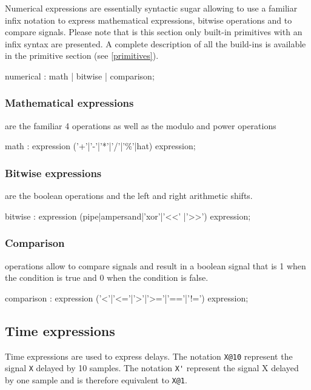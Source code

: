 \documentclass[a4paper,10pt]{book}
\begin{document}
Numerical expressions are essentially syntactic sugar allowing to use a familiar infix notation to express mathematical expressions, bitwise operations and to compare signals. Please note that is this section only built-in primitives with an infix syntax are presented. A complete description of all the build-ins is available in the primitive section (see \ref{primitives}). 

\begin{rail}
numerical : math | bitwise | comparison;
\end{rail}

\subsubsection{Mathematical expressions} are the familiar 4 operations as well as the modulo and power operations
\begin{rail}
math : expression ('+'|'-'|'*'|'/'|'\%'|hat) expression;
\end{rail}
 

\subsubsection{Bitwise expressions} are the boolean operations and the left and right arithmetic shifts.

\begin{rail}
bitwise : expression (pipe|ampersand|'xor'|'<<' |'>>') expression;
\end{rail}

\subsubsection{Comparison} operations allow to compare signals and result in a boolean signal that is 1 when the condition is true and 0 when the condition is false.

\begin{rail}
comparison : expression ('<'|'<='|'>'|'>='|'=='|'!=') expression;
\end{rail}



\subsection{Time expressions}

Time expressions are used to express delays. The notation \lstinline'X@10' represent the signal \lstinline'X' delayed by 10 samples. The notation \lstinline"X'" represent the signal X delayed by one sample and is therefore equivalent to \lstinline'X@1'.
\end{document}
